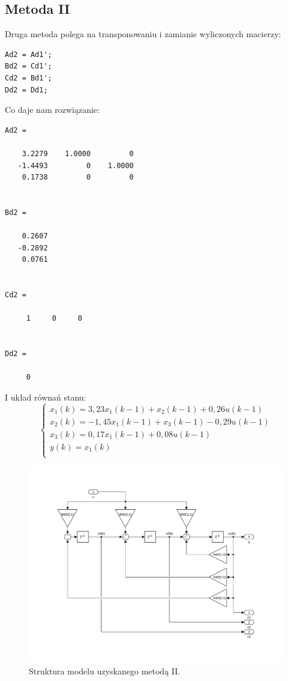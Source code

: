 \subsection{Metoda II}
Druga metoda polega na transponowaniu i zamianie wyliczonych macierzy:
\begin{verbatim}
Ad2 = Ad1';
Bd2 = Cd1';
Cd2 = Bd1';
Dd2 = Dd1;
\end{verbatim}
Co daje nam rozwiązanie:
\begin{verbatim}
Ad2 =

    3.2279    1.0000         0
   -1.4493         0    1.0000
    0.1738         0         0


Bd2 =

    0.2607
   -0.2892
    0.0761


Cd2 =

     1     0     0


Dd2 =

     0
\end{verbatim}
I układ równań stanu:
\[
\left\{
\begin{array}{l}
	x_1(k)= 3,23x_1(k-1) + x_2(k-1) + 0,26u(k-1) \\
	x_2(k)= -1,45x_1(k-1) + x_3(k-1) -0,29u(k-1) \\
	x_3(k)= 0,17x_1(k-1) + 0,08u(k-1) \\
	y(k)= x_1(k) \\ 
\end{array}
\right.
\]
\begin{figure}[H]
\centering
 \includegraphics[width=\textwidth]{img/obj2.pdf}
\caption{Struktura modelu uzyskanego metodą II.}
\end{figure}



